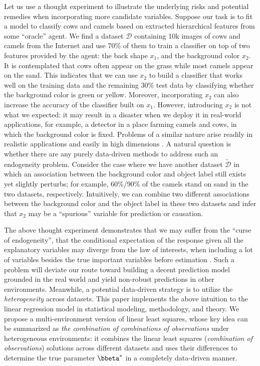 \documentclass[10pt]{article}
\numberwithin{equation}{section}
\begin{document}
{Let us use a thought experiment to illustrate the underlying risks and potential remedies when incorporating more candidate variables. Suppose our task is to fit a model to classify cows and camels based on extracted hierarchical features from some ``oracle'' agent. We find a dataset $\mathcal{D}$ containing 10k images of cows and camels from the Internet and use 70\% of them to train a classifier on top of two features provided by the agent: the back shape $x_1$, and the background color $x_2$. It is contemplated that cows often appear on the grass while most camels appear on the sand. This indicates that we can use $x_2$ to build a classifier that works well on the training data and the remaining $30\%$ test data by classifying whether the background color is green or yellow. Moreover, incorporating $x_2$ can also increase the accuracy of the classifier built on $x_1$. However, introducing $x_2$ is not what we expected: it may result in a disaster when we deploy it in real-world applications, for example, a detector in a place farming camels and cows, in which the background color is fixed. Problems of a similar nature arise readily in realistic applications \citep{torralba2011unbiased, geirhos2020shortcut} and easily in high dimensions \citep{fan2014endogeneity}. A natural question is whether there are any purely data-driven methods to address such an endogeneity problem. Consider the case where we have another dataset $\tilde{\mathcal{D}}$ in which an association between the background color and object label still exists yet slightly perturbs; for example, 60\%/90\% of the camels stand on sand in the two datasets, respectively. Intuitively, we can combine two different associations between the background color and the object label in these two datasets and infer that $x_2$ may be a ``spurious'' variable for prediction or causation.

The above thought experiment demonstrates that we may suffer from the ``curse of endogeneity'', that the conditional expectation of the response given all the explanatory variables may diverge from the law of interests, when including a lot of variables besides the true important variables before estimation \citep{fan2014challenges}. Such a problem will deviate our route toward building a decent prediction model grounded in the real world and yield non-robust predictions in other environments. Meanwhile, a potential data-driven strategy is to utilize the \emph{heterogeneity} across datasets. This paper implements the above intuition to the linear regression model in statistical modeling, methodology, and theory. We propose a multi-environment version of linear least squares, whose key idea can be summarized as \emph{the combination of combinations of observations} under heterogeneous environments: it combines the linear least squares (\emph{combination of observations}) solutions across different datasets and uses their differences to determine the true parameter $\bbeta^*$ in a completely data-driven manner.

}
\end{document}
